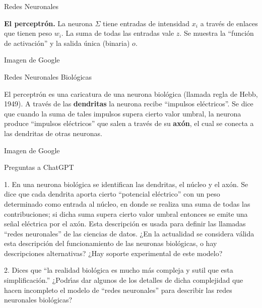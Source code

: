 \documentclass[10pd,hyperref={colorlinks=true}]{beamer}
\begin{document}

\begin{frame}{Redes Neuronales}
 \vfill

 {\bf El perceptr\'on.} La neurona $\Sigma$ tiene 
 entradas de intensidad $x_i$ a trav\'es de enlaces 
 que tienen peso $w_i$. La suma de todas las entradas 
 vale $z$. Se muestra la ``funci\'on de activaci\'on'' 
 y la salida \'unica (binaria) $o$.

 \vfill
 \centerline{}

 \centerline{\tiny Imagen de Google}
 \vfill

\end{frame}


\begin{frame}{Redes Neuronales Biol\'ogicas}
 \vfill

El perceptr\'on es una caricatura de una neurona 
biol\'ogica (llamada regla de Hebb, 1949). A trav\'es 
de las {\bf dendritas} la neurona recibe ``impulsos 
el\'ectricos''. Se dice que cuando la suma de tales 
impulsos supera cierto valor umbral, la neurona 
produce ``impulsos el\'ectricos'' que salen a trav\'es 
de su {\bf ax\'on}, el cual se conecta a las dendritas 
de otras neuronas.

 \vfill
 \centerline{}

 \centerline{\tiny Imagen de Google}
 \vfill

\end{frame}


\begin{frame}{Preguntas a ChatGPT}
 \vfill

1. En una neurona biol\'ogica se identifican las dendritas, el n\'ucleo 
y el ax\'on. Se dice que cada dendrita aporta cierto ``potencial 
el\'ectrico'' con un peso determinado como entrada al n\'ucleo, en donde 
se realiza una suma de todas las contribuciones; si dicha suma supera 
cierto valor umbral entonces se emite una señal el\'ectrica por el 
ax\'on. Esta descripci\'on es usada para definir las llamadas ``redes 
neuronales'' de las ciencias de datos. ¿En la actualidad se considera 
v\'alida esta descripci\'on del funcionamiento de las neuronas 
biol\'ogicas, o hay descripciones alternativas? ¿Hay soporte 
experimental de este modelo?

2. Dices que ``la realidad biol\'ogica es mucho m\'as compleja y sutil 
que esta simplificaci\'on.'' ¿Podr\'{\i}as dar algunos de los detalles 
de dicha complejidad que hacen incompleto el modelo de ``redes 
neuronales'' para describir las redes neuronales biol\'ogicas?

 \vfill

\end{frame}
\end{document}
